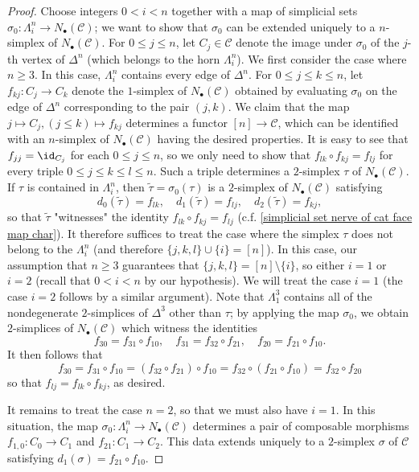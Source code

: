 \begin{proof}
Choose integers $0<i<n$ together with a map of simplicial sets $\sigma_0:\Lambda_i^n\to N_\bullet(\mathcal{C})$; we want to show that $\sigma_0$ can be extended uniquely to a $n$-simplex of $N_\bullet(\mathcal{C})$. For $0\leq j\leq n$, let $C_j\in\mathcal{C}$ denote the image under $\sigma_0$ of the $j$-th vertex of $\Delta^n$ (which belongs to the horn $\Lambda^n_i$). We first consider the case where $n\geq 3$. In this case, $\Lambda^n_i$ contains every edge of $\Delta^n$. For $0\leq j\leq k\leq n$, let $f_{kj}:C_j\to C_k$ denote the $1$-simplex of $N_\bullet(\mathcal{C})$ obtained by evaluating $\sigma_0$ on the edge of $\Delta^n$ corresponding to the pair $(j,k)$. We claim that the map $j\mapsto C_j,(j\leq k)\mapsto f_{kj}$ determines a functor $[n]\to\mathcal{C}$, which can be identified with an $n$-simplex of $N_\bullet(\mathcal{C})$ having the desired properties. It is easy to see that $f_{jj}=\id_{C_j}$ for each $0\leq j\leq n$, so we only need to show that $f_{lk}\circ f_{kj}=f_{lj}$ for every triple $0\leq j\leq k\leq l\leq n$. Such a triple determines a $2$-simplex $\tau$ of $N_\bullet(\mathcal{C})$. If $\tau$ is contained in $\Lambda^n_i$, then $\tilde{\tau}=\sigma_0(\tau)$ is a $2$-simplex of $N_\bullet(\mathcal{C})$ satisfying
\[d_0(\tilde{\tau})=f_{lk},\quad d_1(\tilde{\tau})=f_{lj},\quad d_2(\tilde{\tau})=f_{kj},\]
so that $\tilde{\tau}$ "witnesses" the identity $f_{lk}\circ f_{kj}=f_{lj}$ (c.f. \cref{simplicial set nerve of cat face map char}). It therefore suffices to treat the case where the simplex $\tau$ does not belong to the $\Lambda^n_i$ (and therefore $\{j,k,l\}\cup\{i\}=[n]$). In this case, our assumption that $n\geq 3$ guarantees that $\{j,k,l\}=[n]\setminus\{i\}$, so either $i=1$ or $i=2$ (recall that $0<i<n$ by our hypothesis). We will treat the case $i=1$ (the case $i=2$ follows by a similar argument). Note that $\Lambda^3_1$ contains all of the nondegenerate $2$-simplices of $\Delta^3$ other than $\tau$; by applying the map $\sigma_0$, we obtain $2$-simplices of $N_\bullet(\mathcal{C})$ which witness the identities
\[f_{30}=f_{31}\circ f_{10},\quad f_{31}=f_{32}\circ f_{21},\quad f_{20}=f_{21}\circ f_{10}.\]
It then follows that
\[f_{30}=f_{31}\circ f_{10}=(f_{32}\circ f_{21})\circ f_{10}=f_{32}\circ(f_{21}\circ f_{10})=f_{32}\circ f_{20}\]
so that $f_{lj}=f_{lk}\circ f_{kj}$, as desired.\par
It remains to treat the case $n=2$, so that we must also have $i=1$. In this situation, the map $\sigma_0:\Lambda^n_i\to N_\bullet(\mathcal{C})$ determines a pair of composable morphisms $f_{1,0}:C_0\to C_1$ and $f_{21}:C_1\to C_2$. This data extends uniquely to a $2$-simplex $\sigma$ of $\mathcal{C}$ satisfying $d_1(\sigma)=f_{21}\circ f_{10}$.
\end{proof}

